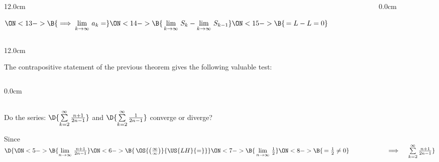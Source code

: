 \begin{frame}
\begin{columns}
\begin{column}{12.0cm}
	\vspace{0.6cm}
	
	$
	\ON<13->{\B{\implies \lim \limits_{k \to \infty}\, a_k = }}
	\ON<14->{\B{\,\lim \limits_{k \to \infty}\,S_k - \lim \limits_{k \to \infty}\,S_{k-1}}}
	\ON<15->{\B{\, = L - L = 0}}$
\end{column}
\begin{column}{0.0cm}\end{column}
\end{columns}
\end{frame}

\begin{frame}
\scriptsize
\begin{columns}
\begin{column}{12.0cm}

The contrapositive statement of the previous theorem gives the following valuable test:

\vspace{0.6cm}

\begin{columns}\begin{column}{0.0cm}\end{column}\end{columns}

\vspace{0.7cm}

\EX Do the series:  $\D{\sum \limits_{k=2}^{\infty} \frac{n+1}{2n-1}}$ \quad and \quad $\D{\sum \limits_{k=2}^{\infty} \frac{1}{2n-1}}$ converge or diverge?

\vspace{0.7cm}

Since \quad $\D{
\ON<5->{\B{\lim \limits_{n \to \infty}\,\frac{n+1}{2n-1}}}
\ON<6->{\B{\,\OS{\left(\frac{\infty}{\infty}\right)}{\US{LH}{=}}}}
\ON<7->{\B{\,\lim \limits_{n \to \infty}\,\frac{1}{2}}}
\ON<8->{\B{\, = \frac{1}{2} \ne 0}} \hspace{2.0cm} 
\implies \quad \sum \limits_{k=2}^{\infty} \frac{n+1}{2n-1}}$ 


\end{column}
\end{columns}
\end{frame}
